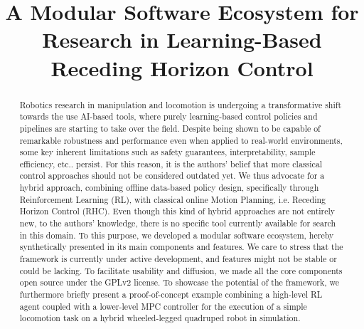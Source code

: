 \documentclass[letterpaper, 10 pt, conference]{ieeeconf}  %
\begin{document}
	
\title{\LARGE \bf
A Modular Software Ecosystem for Research in Learning-Based Receding Horizon Control
}

\author{
}

\maketitle

\begingroup\renewcommand{}
\endgroup

\begingroup\renewcommand{}
\endgroup

\setlength{\textfloatsep}{12.0pt plus 8.0pt minus .0pt}

\begin{abstract}
Robotics research in manipulation and locomotion is undergoing a transformative shift towards the use AI-based tools, where purely learning-based control policies and pipelines are starting to take over the field. Despite being shown to be capable of remarkable robustness and performance even when applied to real-world environments, some key inherent limitations such as safety guarantees, interpretability, sample efficiency, etc.. persist. For this reason, it is the authors' belief that more classical control approaches should not be considered outdated yet. We thus advocate for a hybrid approach, combining offline data-based policy design, specifically through Reinforcement Learning (RL), with classical online Motion Planning, i.e. Receding Horizon Control (RHC). Even though this kind of hybrid approaches are not entirely new, to the authors' knowledge, there is no specific tool currently available for search in this domain. To this purpose, we developed a modular software ecosystem, hereby synthetically presented in its main components and features. We care to stress that the framework is currently under active development, and features might not be stable or could be lacking. To facilitate usability and diffusion, we made all the core components open source under the GPLv2 license. To showcase the potential of the framework, we furthermore briefly present a proof-of-concept example combining a high-level RL agent coupled with a lower-level MPC controller for the execution of a simple locomotion task on a hybrid wheeled-legged quadruped robot in simulation.
\end{abstract}

\IEEEpeerreviewmaketitle


%





\clearpage


\end{document}
